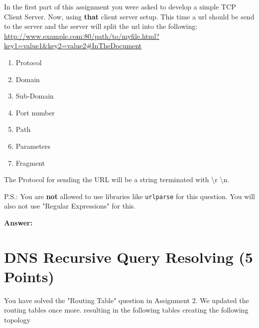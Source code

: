 \documentclass{WeSTassignment}
\begin{document}
In the first part of this assignment you were asked to develop a simple TCP Client Server. Now, using \textbf{that} client server setup.
This time a url should be send to the server and the server will split the url into the following:\\ 

\url{http://www.example.com:80/path/to/myfile.html?key1=value1&key2=value2#InTheDocument}

\begin{enumerate}
\item Protocol
\item Domain
\item Sub-Domain
\item Port number
\item Path
\item Parameters
\item Fragment
\end{enumerate}

The Protocol for sending the URL will be a string terminated with \backslash r \backslash n.

P.S.: You are \textbf{not} allowed to use libraries like \texttt{urlparse} for this question. You will also not use "Regular Expressions" for this. 

\textbf{Answer:} 



\section{DNS Recursive Query Resolving (5 Points)}

You have solved the "Routing Table" question in Assignment 2. We updated the routing tables once more. resulting in the following tables creating the following topology 
\end{document}

